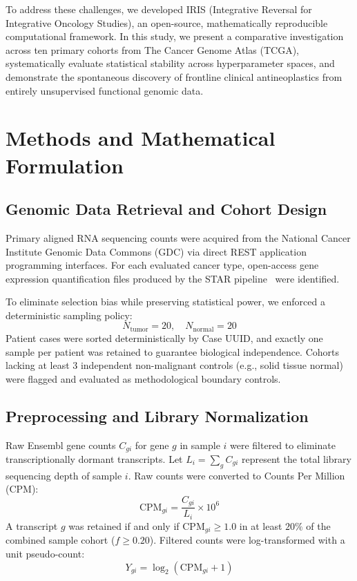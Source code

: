 \documentclass[10pt,journal,compsoc,twocolumn]{IEEEtran}
\begin{document}
To address these challenges, we developed IRIS (Integrative Reversal for Integrative Oncology Studies), an open-source, mathematically reproducible computational framework. In this study, we present a comparative investigation across ten primary cohorts from The Cancer Genome Atlas (TCGA), systematically evaluate statistical stability across hyperparameter spaces, and demonstrate the spontaneous discovery of frontline clinical antineoplastics from entirely unsupervised functional genomic data.

\section{Methods and Mathematical Formulation}

\subsection{Genomic Data Retrieval and Cohort Design}
Primary aligned RNA sequencing counts were acquired from the National Cancer Institute Genomic Data Commons (GDC) via direct REST application programming interfaces. For each evaluated cancer type, open-access gene expression quantification files produced by the STAR pipeline~\cite{dobin2013star} were identified. 

To eliminate selection bias while preserving statistical power, we enforced a deterministic sampling policy:
\begin{equation}
    N_{\text{tumor}} = 20, \quad N_{\text{normal}} = 20
\end{equation}
Patient cases were sorted deterministically by Case UUID, and exactly one sample per patient was retained to guarantee biological independence. Cohorts lacking at least 3 independent non-malignant controls (e.g., solid tissue normal) were flagged and evaluated as methodological boundary controls.

\subsection{Preprocessing and Library Normalization}
Raw Ensembl gene counts $C_{gi}$ for gene $g$ in sample $i$ were filtered to eliminate transcriptionally dormant transcripts. Let $L_i = \sum_g C_{gi}$ represent the total library sequencing depth of sample $i$. Raw counts were converted to Counts Per Million (CPM):
\begin{equation}
    \text{CPM}_{gi} = \frac{C_{gi}}{L_i} \times 10^6
\end{equation}
A transcript $g$ was retained if and only if $\text{CPM}_{gi} \ge 1.0$ in at least $20\%$ of the combined sample cohort ($f \ge 0.20$). Filtered counts were log-transformed with a unit pseudo-count:
\begin{equation}
    Y_{gi} = \log_2(\text{CPM}_{gi} + 1)
\end{equation}
\end{document}
